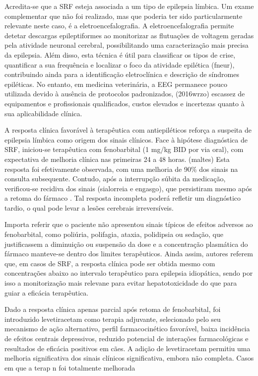 Acredita-se que a SRF esteja associada a um tipo de epilepsia límbica. Um exame complementar que não foi realizado, mas que poderia ter sido particularmente relevante neste caso, é a eletroencefalografia. A eletroencefalografia permite detetar descargas epileptiformes ao monitorizar as flutuações de voltagem geradas pela atividade neuronal cerebral, \cite{Wang2025} possibilitando uma caracterização mais precisa da epilepsia. \cite{Lyon2024} Além disso, esta técnica é útil para classificar os tipos de crise, quantificar a sua frequência e localizar o foco da atividade epilética (fneur), contribuindo ainda para a identificação eletroclínica e descrição de síndromes epiléticas. \cite{Lyon2024} No entanto, em medicina veterinária, a EEG permanece pouco utilizada devido à ausência de protocolos padronizados, (2016wrzo) escassez de equipamentos e profissionais qualificados, custos elevados e incertezas quanto à sua aplicabilidade clínica. \cite{Everest2024}\cite{Luca2023}


A resposta clínica favorável à terapêutica com antiepiléticos reforça a suspeita  de epilepsia límbica como origem dos sinais clínicos. Face à hipótese diagnóstica de SRF, iniciou-se terapêutica com fenobarbital (1 mg/kg BID por via oral), com expectativa de melhoria clínica nas primeiras 24 a 48 horas. (maltes) Esta resposta foi efetivamente observada, com uma melhoria de 90\% dos sinais na consulta subsequente. Contudo, após a interrupção súbita da medicação, verificou-se recidiva dos sinais (sialorreia e engasgo), que persistiram mesmo após a retoma do fármaco . Tal resposta incompleta poderá refletir um diagnóstico tardio, o qual pode levar a lesões cerebrais irreversíveis. \cite{Wang2025}


Importa referir que o paciente não apresentou sinais típicos de efeitos adversos ao fenobarbital, como poliúria, polifagia, ataxia, polidipsia ou sedação, que justificassem a diminuição ou suspensão da dose e a concentração plasmática do fármaco manteve-se dentro dos limites terapêuticos. Ainda assim, autores referem que, em casos de SRF, a resposta clínica pode ser obtida mesmo com concentrações abaixo ao intervalo terapêutico para epilepsia idiopática, sendo por isso a monitorização mais relevane para evitar hepatotoxicidade do que para guiar a eficácia terapêutica.


Dado a resposta clínica apenas parcial após retoma de fenobarbital, foi introduzido levetiracetam como terapia adjuvante, selecionado pelo seu mecanismo de ação alternativo, perfil farmacocinético favorável, baixa incidência de efeitos centrais depressivos, reduzido potencial de interações farmacológicas \cite{Deshpande2014} e resultados de eficácia positivos em cães.\cite{ajvr}  A adição de levetiracetam permitiu uma melhoria significativa dos sinais clínicos significativa, embora não completa. Casos em que a terap n foi totalmente melhorada


